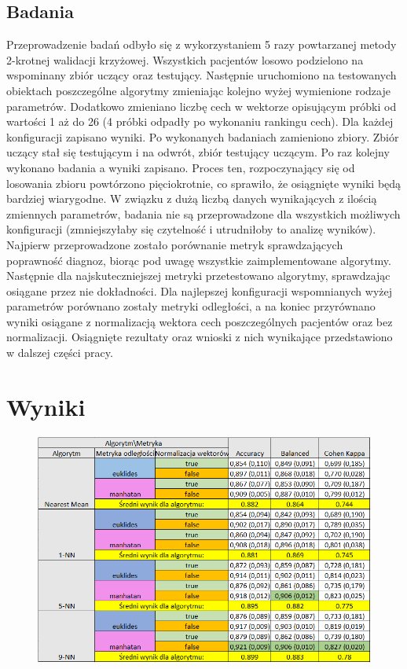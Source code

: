 \documentclass[12pt]{article}
\begin{document}
\subsection{Badania}
\indent  Przeprowadzenie badań odbyło się z wykorzystaniem 5 razy powtarzanej metody 2-krotnej walidacji krzyżowej. Wszystkich pacjentów losowo podzielono na wspominany zbiór uczący oraz testujący. Następnie uruchomiono na testowanych obiektach poszczególne algorytmy zmieniając kolejno wyżej wymienione rodzaje parametrów. Dodatkowo zmieniano liczbę cech w wektorze opisującym próbki od wartości 1 aż do 26 (4 próbki odpadły po wykonaniu rankingu cech). Dla każdej konfiguracji zapisano wyniki. Po wykonanych badaniach zamieniono zbiory. Zbiór uczący stał się testującym i na odwrót, zbiór testujący uczącym. Po raz kolejny wykonano badania a wyniki zapisano. Proces ten, rozpoczynający się od losowania zbioru powtórzono pięciokrotnie, co sprawiło, że osiągnięte wyniki będą bardziej wiarygodne.
\newline
\indent W związku z dużą liczbą danych wynikających z ilością zmiennych parametrów, badania nie są przeprowadzone dla wszystkich możliwych konfiguracji (zmniejszyłaby się czytelność i utrudniłoby to analizę wyników). Najpierw przeprowadzone zostało porównanie metryk sprawdzających poprawność diagnoz, biorąc pod uwagę wszystkie zaimplementowane algorytmy. Następnie dla najskuteczniejszej metryki przetestowano algorytmy, sprawdzając osiągane przez nie dokładności. Dla najlepszej konfiguracji wspomnianych wyżej parametrów porównano zostały metryki odległości, a na koniec przyrównano wyniki osiągane z normalizacją wektora cech poszczególnych pacjentów oraz bez normalizacji. Osiągnięte rezultaty oraz wnioski z nich wynikające przedstawiono w dalszej części pracy.

\section{Wyniki}
\newpage 
\begin{figure}[H]
	\centering
		\includegraphics[scale=0.75]{images/ogolna_tabela.png}
\end{figure}
\end{document}
